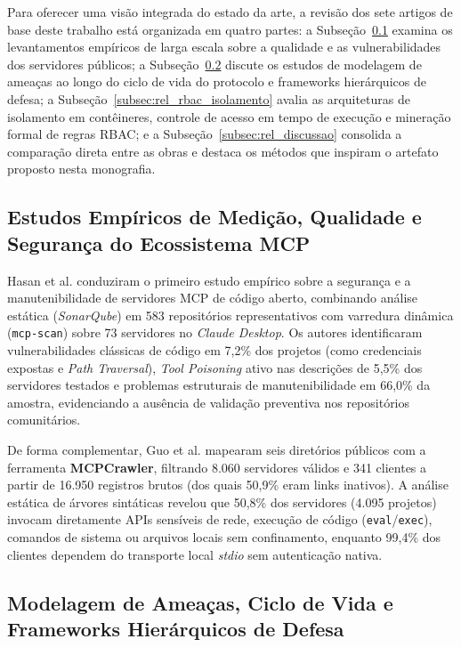 Para oferecer uma visão integrada do estado da arte, a revisão dos sete artigos de base deste trabalho está organizada em quatro partes: a Subseção~\ref{subsec:rel_medicao} examina os levantamentos empíricos de larga escala sobre a qualidade e as vulnerabilidades dos servidores públicos; a Subseção~\ref{subsec:rel_ameacas_hierarquia} discute os estudos de modelagem de ameaças ao longo do ciclo de vida do protocolo e frameworks hierárquicos de defesa; a Subseção~\ref{subsec:rel_rbac_isolamento} avalia as arquiteturas de isolamento em contêineres, controle de acesso em tempo de execução e mineração formal de regras RBAC; e a Subseção~\ref{subsec:rel_discussao} consolida a comparação direta entre as obras e destaca os métodos que inspiram o artefato proposto nesta monografia.

\subsection{Estudos Empíricos de Medição, Qualidade e Segurança do Ecossistema MCP}
\label{subsec:rel_medicao}

Hasan et al. \cite{hasan2026mcp} conduziram o primeiro estudo empírico sobre a segurança e a manutenibilidade de servidores MCP de código aberto, combinando análise estática (\textit{SonarQube}) em 583 repositórios representativos com varredura dinâmica (\texttt{mcp-scan}) sobre 73 servidores no \textit{Claude Desktop}. Os autores identificaram vulnerabilidades clássicas de código em 7,2\% dos projetos (como credenciais expostas e \textit{Path Traversal}), \textit{Tool Poisoning} ativo nas descrições de 5,5\% dos servidores testados e problemas estruturais de manutenibilidade em 66,0\% da amostra, evidenciando a ausência de validação preventiva nos repositórios comunitários.

De forma complementar, Guo et al. \cite{guo2025measurement} mapearam seis diretórios públicos com a ferramenta \textbf{MCPCrawler}, filtrando 8.060 servidores válidos e 341 clientes a partir de 16.950 registros brutos (dos quais 50,9\% eram links inativos). A análise estática de árvores sintáticas revelou que 50,8\% dos servidores (4.095 projetos) invocam diretamente APIs sensíveis de rede, execução de código (\texttt{eval}/\texttt{exec}), comandos de sistema ou arquivos locais sem confinamento, enquanto 99,4\% dos clientes dependem do transporte local \textit{stdio} sem autenticação nativa.

\subsection{Modelagem de Ameaças, Ciclo de Vida e Frameworks Hierárquicos de Defesa}
\label{subsec:rel_ameacas_hierarquia}

